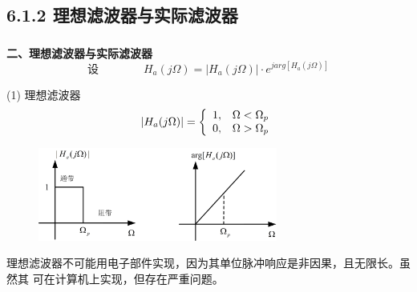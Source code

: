 \documentclass[notheorems,compress,mathserif,table]{beamer}
\begin{document}

\subsection{6.1.2 理想滤波器与实际滤波器}
\begin{frame}\frametitle{}%
\textbf{二、理想滤波器与实际滤波器}
$$\mbox{设}\quad\quad\quad\quad  H_{a}(j\Omega)=|H_{a}(j\Omega)|\cdot e^{jarg[H_{a}(j\Omega)]}$$

 (1) 理想滤波器
   $$|H_{a}(j\Omega)| = \left\{\begin{array}
         {r@{,\quad}l}
         1 &\mbox{$\Omega < \Omega_{p}$}\\
         0 &\mbox{$\Omega > \Omega_{p}$}
        \end{array} \right.
   $$

   \begin{figure}[h]
       \centering
       \includegraphics[width=0.7\textwidth]{fig2lxlbqtx.jpg}
   \end{figure}
  理想滤波器不可能用电子部件实现，因为其单位脉冲响应是非因果，且无限长。虽然其
   可在计算机上实现，但存在严重问题。

\end{frame}
\end{document}
